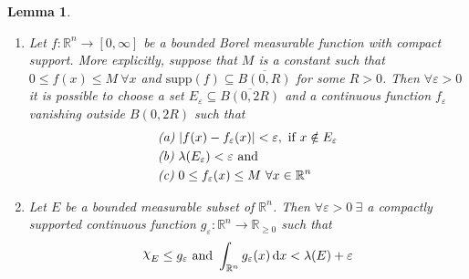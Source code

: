 \documentclass[11pt]{article}
\newtheorem{lemma}[theorem]{Lemma}
\theoremstyle{definition}
\theoremstyle{proof}
\newcommand{\mychi}{\raisebox{2pt}{$\chi$}}
\begin{document}
\begin{lemma}\label{fandcharbyposcont}
    \renewcommand{\labelenumi}{\emph{\Roman{enumi}.}}
    \begin{enumerate}
        \item Let $f : \mathbb{R}^{n} \to [0, \infty]$ be a bounded Borel measurable function with compact support.
            More explicitly, suppose that $M$ is a constant such that $0 \leq f(x) \leq M \ \forall x$ and $\text{supp} (f) \subseteq \overline{B(0, R)}$ for some $R > 0$.
            Then $\forall \varepsilon > 0$ it is possible to choose a set $E_\varepsilon \subseteq \overline{B(0, 2R)}$ and a continuous function $f_ \varepsilon $ vanishing outside $B(0, 2R)$ such that
            \begin{equation*}
                \begin{split}
                    &\emph{(a)} \ |f(x) - f_ \varepsilon (x)| < \varepsilon , \ \text{if} \ x \notin E_ \varepsilon \\
                    &\emph{(b)} \ \lambda (E_ \varepsilon ) < \varepsilon \ \text{and} \\
                    &\emph{(c)} \ 0 \leq f_ \varepsilon (x) \leq M \ \forall x \in \mathbb{R}^{n}
                \end{split}
            \end{equation*}
        \item Let $E$ be a bounded measurable subset of $\mathbb{R}^{n}$.
            Then $\forall \varepsilon > 0 \ \exists$ a compactly supported continuous function $g_{\varepsilon } : \mathbb{R}^{n} \to \mathbb{R}_{\ge 0}$ such that
            \[
                \mychi _E \leq g_{\varepsilon } \ \text{and} \ \int_{\mathbb{R}^{n}} g_{\varepsilon }(x) \, \mathrm{d} x < \lambda (E) + \varepsilon 
            \]
    \end{enumerate}
\end{lemma}
\end{document}
